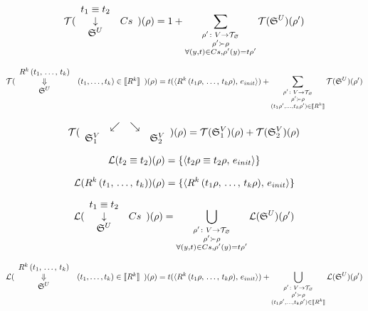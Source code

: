 \[ \mathcal{T}( \begin{array}{cl} t_1 \equiv t_2 \\ \downarrow & Cs \\ \mathfrak{S}^{U} \end{array} )(\rho) = 1 +
      \sum\limits_{\substack{ \rho' \colon V \to \mathcal{T}_{\varnothing} \\
                                      \rho' \succ \rho \\
                                      \forall (y, t) \in Cs, \rho'(y) = t \rho'  }}
           \mathcal{T}(\mathfrak{S}^{U})(\rho')  \]

\[ \mathcal{T}( \begin{array}{cl} R^k\,(t_1, \, \dots, \, t_k) \\ \Downarrow &  (t_1, \dots, t_k) \in \llbracket R^k \rrbracket   \\ \mathfrak{S}^{U} \end{array} )(\rho) =
      t(\langle R^k\,(t_1 \rho, \, \dots, \, t_k \rho) ,\, e_{init} \rangle) +
      \sum\limits_{\substack{ \rho' \colon V \to \mathcal{T}_{\varnothing} \\
                                      \rho' \succ \rho \\
                                      (t_1 \rho', \dots, t_k \rho') \in \llbracket R^k \rrbracket  }}
           \mathcal{T}(\mathfrak{S}^{U})(\rho')  \]

\[ \mathcal{T}(\begin{array}{cccc} & \swarrow & \searrow \\ \mathfrak{S}_1^{V} & & & \mathfrak{S}_2^{V} \end{array})(\rho) =
      \mathcal{T}(\mathfrak{S}_1^{V})(\rho) + \mathcal{T}(\mathfrak{S}_2^{V})(\rho) \]


\[ \mathcal{L}(t_2 \equiv t_2)(\rho) = \{ \langle t_2 \rho \equiv t_2 \rho ,\, e_{init} \rangle \} \]

\[ \mathcal{L}(R^k\,(t_1, \, \dots, \, t_k))(\rho) = \{ \langle R^k\,(t_1 \rho, \, \dots, \, t_k \rho) ,\, e_{init} \rangle \} \]

\[ \mathcal{L}(\begin{array}{cl} t_1 \equiv t_2 \\ \downarrow & Cs \\ \mathfrak{S}^{U} \end{array} )(\rho) =
      \bigcup\limits_{\substack{ \rho' \colon V \to \mathcal{T}_{\varnothing} \\
                                      \rho' \succ \rho \\
                                      \forall (y, t) \in Cs, \rho'(y) = t \rho'  }}
           \mathcal{L}(\mathfrak{S}^{U})(\rho')  \]

\[ \mathcal{L}( \begin{array}{cl} R^k\,(t_1, \, \dots, \, t_k) \\ \Downarrow &  (t_1, \dots, t_k) \in \llbracket R^k \rrbracket   \\ \mathfrak{S}^{U} \end{array} )(\rho) =
      t(\langle R^k\,(t_1 \rho, \, \dots, \, t_k \rho) ,\, e_{init} \rangle) +
      \bigcup\limits_{\substack{ \rho' \colon V \to \mathcal{T}_{\varnothing} \\
                                      \rho' \succ \rho \\
                                      (t_1 \rho', \dots, t_k \rho') \in \llbracket R^k \rrbracket  }}
           \mathcal{L}(\mathfrak{S}^{U})(\rho')  \]

